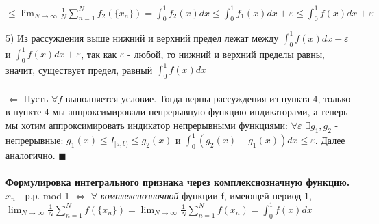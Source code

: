 $\leqslant \lim_{N \to \infty} \frac{1}{N} \sum_{n=1}^N f_2(\{x_n\}) = \int_0^1 f_2(x)dx \leqslant \int_0^1 f_1(x)dx + \varepsilon \leqslant \int_0^1 f(x)dx + \varepsilon$ \par
5) Из рассуждения выше нижний и верхний предел лежат между $\int_0^1 f(x)dx - \varepsilon$ и $\int_0^1 f(x)dx + \varepsilon$, так как $\varepsilon$ - любой, то нижний и верхний пределы равны, значит, существует предел, равный $\int_0^1 f(x)dx$ \\
\\
$\Leftarrow$ Пусть $\forall f$ выполняется условие. Тогда верны рассуждения из пункта 4, только в пункте 4 мы аппроксимировали непрерывную функцию индикаторами, а теперь мы хотим аппроксимировать индикатор непрерывными функциями: $\forall \varepsilon$ $\exists g_1, g_2$ - непрерывные: $g_1(x) \leqslant I_{[a; b)} \leqslant g_2(x)$ и $\int_0^1 (g_2(x) - g_1(x))dx \leqslant \varepsilon$. Далее аналогично.
$\blacksquare$ \\
\\
\textbf{Формулировка интегрального признака через комплекснозначную функцию.} $x_n$ - р.р. mod 1 $\Leftrightarrow$ $\forall$ \emph{комплекснозначной} функции f, имеющей период 1, $\lim_{N \to \infty} \frac{1}{N} \sum_{n=1}^N f(\{x_n\}) = \lim_{N \to \infty} \frac{1}{N} \sum_{n=1}^N f(x_n) = \int_{0}^{1} f(x)dx$